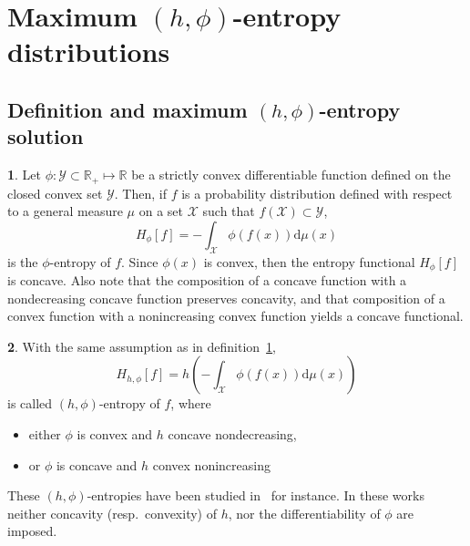 \documentclass[english]{elsarticle}
\theoremstyle{definition}
\newtheorem{defn}{\protect\definitionname}
\theoremstyle{plain}
\theoremstyle{plain}
\def\dmu{\mathrm{d}\mu}
\def\Rset{\mathbb{R}}
\def\X{\mathcal{X}}
\def\Y{\mathcal{Y}}
\providecommand{\definitionname}{Definition}
\begin{document}

\section{Maximum $(h,\phi)$-entropy distributions}
\label{sec:MaxPhiEnt}



\subsection{Definition and maximum $(h,\phi)$-entropy solution}

\label{subsec:DefinitionPhiEnt}

\begin{defn}\label{def:phi-entropy}
  Let  $\phi:   \Y  \subset  \Rset_+   \mapsto  \Rset$  be  a   strictly  convex
  differentiable function defined  on the closed convex set  $\Y$.  Then, if $f$
  is a probability distribution defined  with respect to a general measure $\mu$
  on a set $\X$ such that $f(\X) \subset \Y$,
  \begin{equation}\label{eq:phi-entropy}
    H_\phi[f] = - \int_\X \phi(f(x)) \dmu(x)
  \end{equation}
  is the  $\phi$-entropy of  $f$.  Since $\phi(x)$  is convex, then  the entropy
  functional  $H_\phi[f]$ is  concave.   Also  note that  the  composition of  a
  concave function  with a  nondecreasing concave function  preserves concavity,
  and that composition of a convex function with a nonincreasing convex function
  yields a concave functional.
\end{defn}

\begin{defn}\label{def:h_phi-entropy}
  With the same assumption as in definition~\ref{def:phi-entropy},
  \begin{equation}\label{eq:h-phi-entropy}
    H_{h,\phi}[f] = h\left( - \int_\X \phi(f(x)) \dmu(x) \right)
  \end{equation}
  is called $(h,\phi)$-entropy of $f$, where
  \begin{itemize}
  \item either $\phi$ is convex and $h$ concave nondecreasing,
  \item or $\phi$ is concave and $h$ convex nonincreasing
  \end{itemize}
\end{defn}
These  $(h,\phi)$-entropies  have  been  studied  in~\citet{Sal93,MenMor97}  for
instance. In  these works neither concavity  (resp.\ convexity) of  $h$, nor the
differentiability of $\phi$ are imposed.
\end{document}
